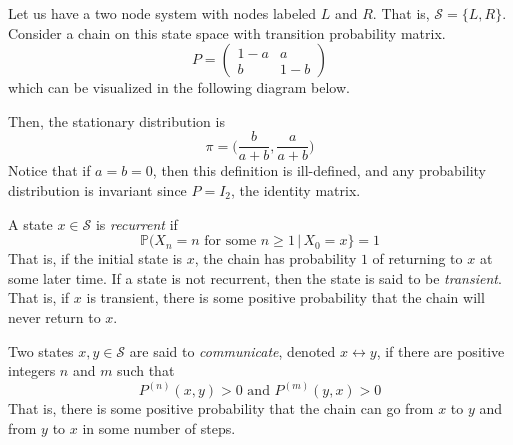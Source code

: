 \documentclass{article}
\begin{document}
    \begin{example}
      Let us have a two node system with nodes labeled $L$ and $R$. That is, $\mathcal{S} = \{L, R\}$. Consider a chain on this state space with transition probability matrix. 
      \begin{equation}
        P = \begin{pmatrix}
        1-a & a \\ b & 1-b 
        \end{pmatrix}
      \end{equation}
      which can be visualized in the following diagram below.
      \begin{center}
      \end{center}

      Then, the stationary distribution is 
      \begin{equation}
        \pi = \Big( \frac{b}{a+b}, \frac{a}{a+b} \Big)
      \end{equation}
      Notice that if $a = b = 0$, then this definition is ill-defined, and any probability distribution is invariant since $P = I_2$, the identity matrix. 
    \end{example}

    \begin{definition}[Recurrent]
      A state $x \in \mathcal{S}$ is \textit{recurrent} if
      \begin{equation}
        \mathbb{P}(X_n = n \text{ for some } n \geq 1 \, | \, X_0 = x\} = 1
      \end{equation}
      That is, if the initial state is $x$, the chain has probability $1$ of returning to $x$ at some later time. If a state is not recurrent, then the state is said to be \textit{transient}. That is, if $x$ is transient, there is some positive probability that the chain will never return to $x$. 
    \end{definition}

    \begin{definition}[Communication]
      Two states $x, y \in \mathcal{S}$ are said to \textit{communicate}, denoted $x \leftrightarrow y$, if there are positive integers $n$ and $m$ such that 
      \begin{equation}
        P^{(n)} (x, y) > 0 \text{ and } P^{(m)} (y, x) > 0
      \end{equation}
      That is, there is some positive probability that the chain can go from $x$ to $y$ and from $y$ to $x$ in some number of steps. 
    \end{definition}
\end{document}

